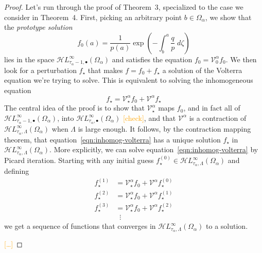 \documentclass{article}
\newcommand{\singexp}[2]{\mathcal{H}L^\infty_{#1, #2}}
\newcommand{\singexpalg}[1]{\singexp{#1}{\bullet}}
\newcommand{\volterra}{\mathcal{V}}
\newcommand{\hardpart}{\mathcal{V}_0}
\newcommand{\softpart}{\mathcal{V}_\star}
\newcommand{\hardker}{k_0}
\newcommand{\solwhole}{f}
\newcommand{\solproto}{f_0}
\newcommand{\solptb}{f_\star}
\theoremstyle{definition}
\theoremstyle{plain}
\begin{document}
\begin{proof}
Let's run through the proof of Theorem~3, specialized to the case we consider in Theorem~4. First, picking an arbitrary point $b \in \Omega_\alpha$, we show that the {\em prototype solution}
\[ \solproto(a) = \frac{1}{p(a)} \exp\left(-\int_{b}^{a}\frac{q}{p}\;d\zeta\right) \]
lies in the space $\singexpalg{\tau_\alpha - 1}(\Omega_\alpha)$ and satisfies the equation $\solproto = \hardpart^\alpha \solproto$. We then look for a perturbation $\solptb$ that makes $\solwhole = \solproto + \solptb$ a solution of the Volterra equation we're trying to solve. This is equivalent to solving the inhomogeneous equation
\begin{equation}\label{eqn:inhomog-volterra}
\solptb = \softpart^\alpha \solproto + \volterra^\alpha \solptb
\end{equation}
The central idea of the proof is to show that $\softpart^\alpha$ maps $\solproto$, and in fact all of $\singexpalg{\tau_\alpha - 1}(\Omega_\alpha)$, into $\singexpalg{\tau_\alpha}(\Omega_\alpha)$ \textcolor{orange}{[check]}, and that $\volterra^\alpha$ is a contraction of $\singexp{\tau_\alpha}{\Lambda}(\Omega_\alpha)$ when $\Lambda$ is large enough. It follows, by the contraction mapping theorem, that equation~\eqref{eqn:inhomog-volterra} has a unique solution $\solptb$ in $\singexp{\tau_\alpha}{\Lambda}(\Omega_\alpha)$. More explicitly, we can solve equation~\eqref{eqn:inhomog-volterra} by Picard iteration. Starting with any initial guess $\solptb^{(0)} \in \singexp{\tau_\alpha}{\Lambda}(\Omega_\alpha)$ and defining
\begin{align*}
\solptb^{(1)} & = \softpart^\alpha \solproto + \volterra^\alpha \solptb^{(0)} \\
\solptb^{(2)} & = \softpart^\alpha \solproto + \volterra^\alpha \solptb^{(1)} \\
\solptb^{(3)} & = \softpart^\alpha \solproto + \volterra^\alpha \solptb^{(2)} \\
& \;\;\vdots
\end{align*}
we get a sequence of functions that converges in $\singexp{\tau_\alpha}{\Lambda}(\Omega_\alpha)$ to a solution.

\textcolor{orange}{[\ldots]}




\end{proof}
\end{document}
